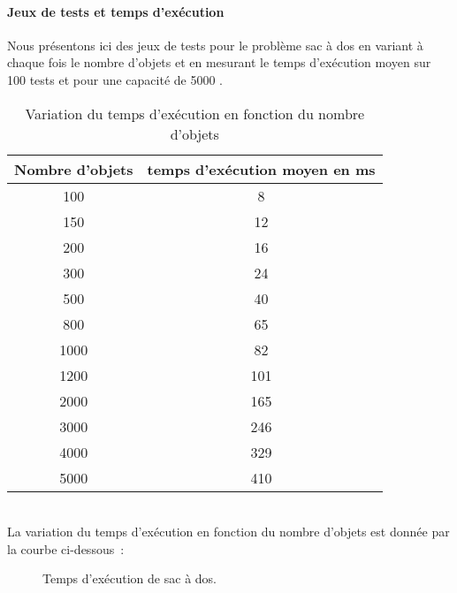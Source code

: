 \paragraph{Jeux de tests et temps d'exécution}

Nous présentons ici des jeux de tests pour le problème sac à dos en variant à chaque fois le nombre d'objets et en mesurant le temps d'exécution moyen sur 100 tests et pour une capacité de 5000 .
\begin{table}[h!]
\centering
\begin{tabular}{|c|c|}
\hline
Nombre d'objets & temps d'exécution moyen en ms\\
\hline
100 & 8\\
\hline
150 & 12\\
\hline
200 & 16\\
\hline
300 & 24\\
\hline
500 & 40\\
\hline
800 & 65\\
\hline
1000 & 82\\
\hline
1200 & 101\\
\hline
2000 & 165\\
\hline
3000 & 246\\
\hline
 4000 & 329\\
\hline
  5000 & 410\\
\hline
\end{tabular}
\caption {Variation du temps d'exécution en fonction du nombre d'objets}
\end{table}\\
La variation du temps d'exécution en fonction du nombre d'objets est donnée par la courbe ci-dessous~:
\begin{figure}[h!]
\centering
{}
\caption{Temps d'exécution de sac à dos.}
\end{figure}

